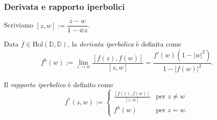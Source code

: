 \begin{frame}
  \frametitle{Derivata e rapporto iperbolici}
  Scriviamo $[z,w]:=\dfrac{z-w}{1-\bar{w}z}$. \pause
  \begin{defn}
    Data $f \in \text{Hol}(\mathbb{D},\mathbb{D})$, la \textit{derivata iperbolica} è definita come
    $$f^h(w):=\lim_{z \longrightarrow w} \frac{[f(z),f(w)]}{[z,w]}=\frac{f'(w)(1-|w|^2)}{1-|f(w)|^2}.$$
  \end{defn}
  \pause
  \begin{defn}
    Il \textit{rapporto iperbolico} è definito come
    $$f^*(z,w):=\begin{cases}
      \frac{[f(z),f(w)]}{[z,w]} & \mbox{per }z\not=w \\
      f^h(w) & \mbox{per }z=w.
    \end{cases}$$
  \end{defn}
\end{frame}

